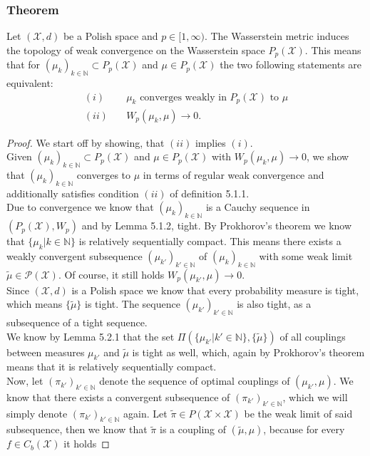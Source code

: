 \documentclass[11pt,a4paper]{article}
\begin{document}
\subsubsection{Theorem}
Let $(\mathcal{X},d)$ be a Polish space and $p\in[1,\infty)$. The Wasserstein metric induces the topology of weak convergence on the Wasserstein space $P_p(\mathcal{X})$. This means that for $(\mu_k)_{k\in\mathbb{N}}\subset{}P_p(\mathcal{X})$ and $\mu\in{}P_p(\mathcal{X})$ the two following statements are equivalent:
\begin{align*}
(i)& \quad \mu_k \text{ converges weakly in } P_p(\mathcal{X}) \text{ to } \mu \\[5pt]
(ii)& \quad W_p(\mu_k,\mu)\rightarrow{}0.
\end{align*} 
\begin{proof}We start off by showing, that $(ii)$ implies $(i)$.\\
Given $(\mu_k)_{k\in\mathbb{N}}\subset{}P_p(\mathcal{X})$ and $\mu\in{}P_p(\mathcal{X})$ with $W_p(\mu_k,\mu)\rightarrow{}0$, we show that $(\mu_k)_{k\in\mathbb{N}}$ converges to $\mu$ in terms of regular weak convergence and additionally satisfies condition $(ii)$ of definition 5.1.1.\vspace{1em}\\
Due to convergence we know that $(\mu_k)_{k\in\mathbb{N}}$ is a Cauchy sequence in $(P_p(\mathcal{X}),W_p)$ and by Lemma 5.1.2, tight. By Prokhorov's theorem we know that $\{\mu_k|k\in\mathbb{N}\}$ is relatively sequentially compact. This means there exists a weakly convergent subsequence $(\mu_{k'})_{k'\in\mathbb{N}}$ of $(\mu_k)_{k\in\mathbb{N}}$ with some weak limit $\tilde{\mu}\in{}\mathcal{P(X)}$. Of course, it still holds $W_p(\mu_{k'},\mu)\rightarrow{}0$. \vspace{1em}\\
Since $(\mathcal{X},d)$ is a Polish space we know that every probability measure is tight, which means $\{\tilde{\mu}\}$ is tight. The sequence 
$(\mu_{k'})_{k'\in\mathbb{N}} $ is also tight, as a subsequence of a tight sequence. \\ We know by Lemma 5.2.1 that the set $\Pi(\{\mu_{k'}|k'\in\mathbb{N}\},\{\tilde{\mu}\})$ of all couplings between measures $\mu_{k'}$ and $\tilde{\mu}$ is tight as well, which, again by Prokhorov's theorem means that it is relatively sequentially compact. \vspace{1em}\\
Now, let $(\pi_{k'})_{k'\in\mathbb{N}}$ denote the sequence of optimal couplings of $(\mu_{k'},\mu)$.
We know that there exists a convergent subsequence of $(\pi_{k'})_{k'\in\mathbb{N}}$, which we will simply denote $(\pi_{k'})_{k'\in\mathbb{N}}$ again. Let $\tilde{\pi}\in{}P(\mathcal{X\times{}\mathcal{X}})$ be the weak limit of said subsequence, then we know that $\tilde{\pi}$ is a coupling of $(\tilde{\mu},\mu)$, because for every $f\in{}C_b(\mathcal{X})$ it holds 

\end{proof}
\end{document}
